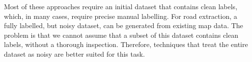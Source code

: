 Most of these approaches require an initial dataset that contains clean labels, which, in many cases, require precise manual labelling. For road extraction, a fully labelled, but noisy dataset, can be generated from existing map data. The problem is that we cannot assume that a subset of this dataset contains clean labels, without a thorough inspection. Therefore, techniques that treat the entire dataset as noisy are better suited for this task. 

